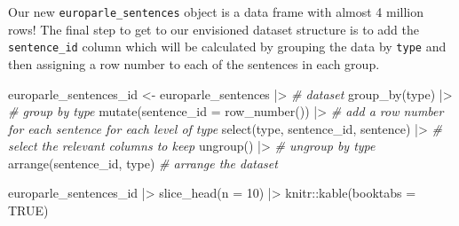 \documentclass[
  letterpaper,
]{scrbook}
\newenvironment{Shaded}{\begin{snugshade}}{\end{snugshade}}
\newcommand{\AttributeTok}[1]{\textcolor[rgb]{0.00,0.00,0.00}{#1}}
\newcommand{\CommentTok}[1]{\textcolor[rgb]{0.00,0.00,0.00}{\textit{#1}}}
\newcommand{\ConstantTok}[1]{\textcolor[rgb]{0.00,0.00,0.00}{#1}}
\newcommand{\DecValTok}[1]{\textcolor[rgb]{0.00,0.00,0.00}{#1}}
\newcommand{\FunctionTok}[1]{\textcolor[rgb]{0.00,0.00,0.00}{#1}}
\newcommand{\NormalTok}[1]{\textcolor[rgb]{0.00,0.00,0.00}{#1}}
\newcommand{\OtherTok}[1]{\textcolor[rgb]{0.00,0.00,0.00}{#1}}
\newcommand{\SpecialCharTok}[1]{\textcolor[rgb]{0.00,0.00,0.00}{#1}}
\begin{document}
Our new \texttt{europarle\_sentences} object is a data frame with almost
4 million rows! The final step to get to our envisioned dataset
structure is to add the \texttt{sentence\_id} column which will be
calculated by grouping the data by \texttt{type} and then assigning a
row number to each of the sentences in each group.

\begin{Shaded}
\begin{Highlighting}[]
\NormalTok{europarle\_sentences\_id }\OtherTok{\textless{}{-}} 
\NormalTok{  europarle\_sentences }\SpecialCharTok{|\textgreater{}} \CommentTok{\# dataset}
  \FunctionTok{group\_by}\NormalTok{(type) }\SpecialCharTok{|\textgreater{}} \CommentTok{\# group by type}
  \FunctionTok{mutate}\NormalTok{(}\AttributeTok{sentence\_id =} \FunctionTok{row\_number}\NormalTok{()) }\SpecialCharTok{|\textgreater{}} \CommentTok{\# add a row number for each sentence for each level of type}
  \FunctionTok{select}\NormalTok{(type, sentence\_id, sentence) }\SpecialCharTok{|\textgreater{}} \CommentTok{\# select the relevant columns to keep}
  \FunctionTok{ungroup}\NormalTok{() }\SpecialCharTok{|\textgreater{}}  \CommentTok{\# ungroup by type}
  \FunctionTok{arrange}\NormalTok{(sentence\_id, type) }\CommentTok{\# arrange the dataset}

\NormalTok{europarle\_sentences\_id }\SpecialCharTok{|\textgreater{}} 
  \FunctionTok{slice\_head}\NormalTok{(}\AttributeTok{n =} \DecValTok{10}\NormalTok{) }\SpecialCharTok{|\textgreater{}} 
\NormalTok{  knitr}\SpecialCharTok{::}\FunctionTok{kable}\NormalTok{(}\AttributeTok{booktabs =} \ConstantTok{TRUE}\NormalTok{)}
\end{Highlighting}
\end{Shaded}
\end{document}
